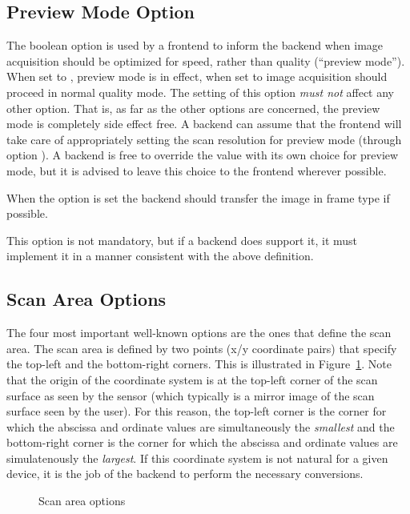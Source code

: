 \documentclass[11pt,DVIps]{report}
\begin{document}
\subsection{Preview Mode Option}

The boolean option  is used by a frontend to inform the
backend when image acquisition should be optimized for speed, rather
than quality (``preview mode'').  When set to ,
preview mode is in effect, when set to  image
acquisition should proceed in normal quality mode.  The setting of
this option \emph{must not\/} affect any other option.  That is, as
far as the other options are concerned, the preview mode is completely
side effect free.  A backend can assume that the frontend will take
care of appropriately setting the scan resolution for preview mode
(through option ).  A backend is free to override the
 value with its own choice for preview mode, but it
is advised to leave this choice to the frontend wherever possible.
\begin{changebar}
When the  option is set the backend should transfer
the image in frame type  if possible.
\end{changebar}

This option is not mandatory, but if a backend does support it, it
must implement it in a manner consistent with the above definition.

\subsection{Scan Area Options}

The four most important well-known options are the ones that define
the scan area.  The scan area is defined by two points (x/y coordinate
pairs) that specify the top-left and the bottom-right corners.  This
is illustrated in Figure~\ref{fig:area}.  Note that the origin of the
coordinate system is at the top-left corner of the scan surface as
seen by the sensor (which typically is a mirror image of the scan
surface seen by the user).  For this reason, the top-left corner is
the corner for which the abscissa and ordinate values are
simultaneously the {\em smallest} and the bottom-right corner is the
corner for which the abscissa and ordinate values are simulatenously
the {\em largest}.  If this coordinate system is not natural for a
given device, it is the job of the backend to perform the necessary
conversions.
\begin{figure}[tbp]
  \begin{center}
    \leavevmode
    \caption{Scan area options}
    \label{fig:area}
  \end{center}
\end{figure}
\end{document}
